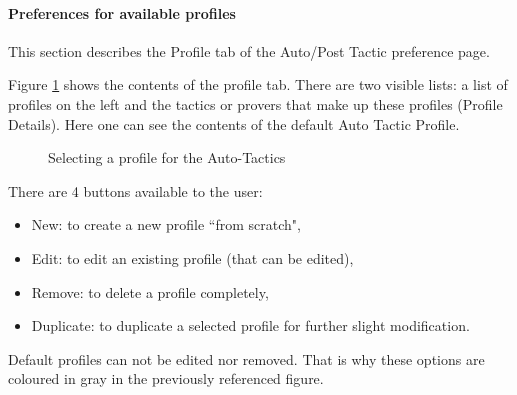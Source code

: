 

\paragraph{Preferences for available profiles}

This section describes the \textsf{Profile} tab of the \textsf{Auto/Post Tactic} preference page. 

Figure \ref{fig_ref_01_preferences9} shows the contents of the profile tab. There are two visible lists: a list of profiles on the left and the tactics or provers that make up these profiles (Profile Details). Here one can see the contents of the default Auto Tactic Profile.

\begin{figure}[!ht]
\begin{center}
	\caption{Selecting a profile for the Auto-Tactics}
	\label{fig_ref_01_preferences9}
\end{center}
\end{figure}

There are 4 buttons available to the user:

\begin{itemize}
	\item New: to create a new profile ``from scratch",
	\item Edit: to edit an existing profile (that can be edited),
	\item Remove: to delete a profile completely,
	\item Duplicate: to duplicate a selected profile for further slight modification.
\end{itemize}

Default profiles can not be edited nor removed. That is why these options are coloured in gray in the previously referenced figure.

